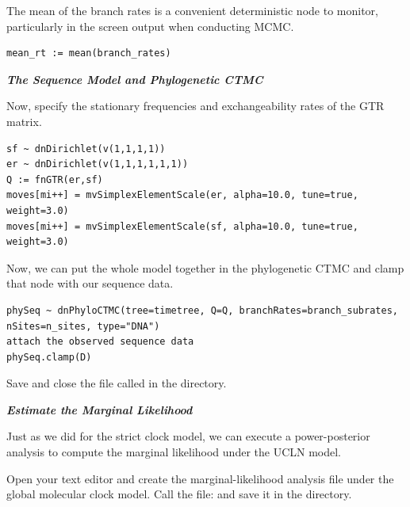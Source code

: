 The mean of the branch rates is a convenient deterministic node to monitor, particularly in the screen output when conducting MCMC.
{\tt \begin{snugshade*}
\begin{lstlisting}
mean_rt := mean(branch_rates) 
\end{lstlisting}
\end{snugshade*}}

\textbf{\textit{The Sequence Model and Phylogenetic CTMC}}

Now, specify the stationary frequencies and exchangeability rates of the GTR matrix.
{\tt \begin{snugshade*}
\begin{lstlisting}
sf ~ dnDirichlet(v(1,1,1,1))
er ~ dnDirichlet(v(1,1,1,1,1,1))
Q := fnGTR(er,sf)
moves[mi++] = mvSimplexElementScale(er, alpha=10.0, tune=true, weight=3.0)
moves[mi++] = mvSimplexElementScale(sf, alpha=10.0, tune=true, weight=3.0)
\end{lstlisting}
\end{snugshade*}}

Now, we can put the whole model together in the phylogenetic CTMC and clamp that node with our sequence data.
{\tt \begin{snugshade*}
\begin{lstlisting}
phySeq ~ dnPhyloCTMC(tree=timetree, Q=Q, branchRates=branch_subrates, nSites=n_sites, type="DNA")
attach the observed sequence data
phySeq.clamp(D)
\end{lstlisting}
\end{snugshade*}}

{\begin{framed}
Save and close the file called {\textcolor{red}{}} in the  directory.
\end{framed}}



\textbf{\textit{Estimate the Marginal Likelihood}}

Just as we did for the strict clock model, we can execute a power-posterior analysis to compute the marginal likelihood under the UCLN model. 

{\begin{framed}
Open your text editor and create the marginal-likelihood analysis file under the global molecular clock model. Call the file: {\textcolor{red}{}} and save it in the  directory.
\end{framed}}

